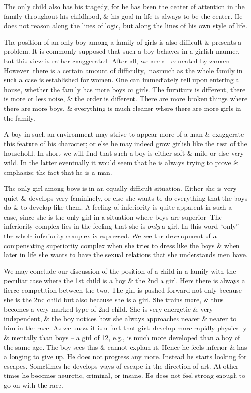 \documentclass{article}
\begin{document}
The only child also has his tragedy, for he has been the center of attention in the family throughout his childhood, \& his goal in life is always to be the center. He does not reason along the lines of logic, but along the lines of his own style of life.

The position of an only boy among a family of girls is also difficult \& presents a problem. It is commonly supposed that such a boy behaves in a girlish manner, but this view is rather exaggerated. After all, we are all educated by women. However, there is a certain amount of difficulty, inasmuch as the whole family in such a case is established for women. One can immediately tell upon entering a house, whether the family has more boys or girls. The furniture is different, there is more or less noise, \& the order is different. There are more broken things where there are more boys, \& everything is much cleaner where there are more girls in the family.

A boy in such an environment may strive to appear more of a man \& exaggerate this feature of his character; or else he may indeed grow girlish like the rest of the household. In short we will find that such a boy is either soft \& mild or else very wild. In the latter eventually it would seem that he is always trying to prove \& emphasize the fact that he is a man.

The only girl among boys is in an equally difficult situation. Either she is very quiet \& develops very femininely, or else she wants to do everything that the boys do \& to develop like them. A feeling of inferiority is quite apparent in such a case, since she is the only girl in a situation where boys are superior. The inferiority complex lies in the feeling that she is \textit{only} a girl. In this word ``only'' the whole inferiority complex is expressed. We see the development of a compensating superiority complex when she tries to dress like the boys \& when later in life she wants to have the sexual relations that she understands men have.

We may conclude our discussion of the position of a child in a family with the peculiar case where the 1st child is a boy \& the 2nd a girl. Here there is always a fierce competition between the two. The girl is pushed forward not only because she is the 2nd child but also because she is a girl. She trains more, \& thus becomes a very marked type of 2nd child. She is very energetic \& very independent, \& the boy notices how she always approaches nearer \& nearer to him in the race. As we know it is a fact that girls develop more rapidly physically \& mentally than boys -- a girl of 12, e.g., is much more developed than a boy of the same age. The boy sees this \& cannot explain it. Hence he feels inferior \& has a longing to give up. He does not progress any more. Instead he starts looking for escapes. Sometimes he develops ways of escape in the direction of art. At other times he becomes neurotic, criminal, or insane. He does not feel strong enough to go on with the race.
\end{document}
